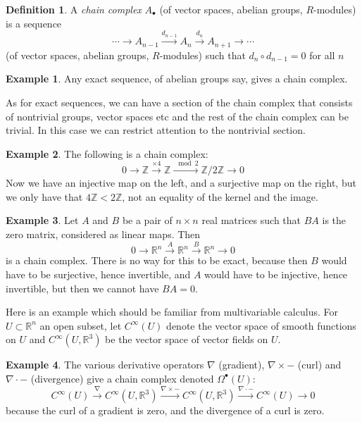 \documentclass{tufte-handout}
\def\RR{\mathbb{R}}
\def\ZZ{\mathbb{Z}}
\DeclareMathOperator{\im}{im}
\theoremstyle{definition}
\newtheorem{definition}{Definition}
\newtheorem{example}{Example}
\begin{document}
\begin{definition}
A \emph{chain complex} $A_\bullet$ (of vector spaces, abelian groups, $R$-modules) is a sequence 
\[
	\cdots \to A_{n-1} \xrightarrow{d_{n-1}} A_n \xrightarrow{d_n} A_{n+1} \to \cdots
\]
(of vector spaces, abelian groups, $R$-modules) such that $d_n\circ d_{n-1} = 
0$\marginnote{equivalently, $\im(d_{n-1}) \subseteq \ker(d_n)$} for all $n$
\end{definition}

\begin{example}
Any exact sequence, of abelian groups say, gives a chain complex.
\end{example}

As for exact sequences, we can have a section of the chain complex that consists of nontrivial groups, vector spaces etc and the rest of the chain complex can be trivial. In this case we can restrict attention to the nontrivial section.

\begin{example}
The following is a chain complex:
\[
	0\to \ZZ \xrightarrow{\times 4} \ZZ \xrightarrow{\mod{2}} \ZZ/2\ZZ \to 0
\]
Now we have an injective map on the left, and a surjective map on the right, but we only have that $4\ZZ < 2\ZZ$, not an equality of the kernel and the image.
\end{example}


\begin{example}
Let $A$ and $B$ be a pair of $n\times n$ real matrices such that $BA$ is the zero matrix, considered as linear maps. Then
\[
	0\to \RR^n \xrightarrow{A} \RR^n \xrightarrow{B} \RR^n \to 0
\]
is a chain complex. There is no way for this to be exact, because then $B$ would have to be surjective, hence invertible, and $A$ would have to be injective, hence invertible, but then we cannot have $BA=0$.
\end{example}

Here is an example which should be familiar from multivariable calculus. For $U\subset \RR^n$ an open subset, let $C^\infty(U)$ denote the vector space of smooth functions on $U$ and $C^\infty(U,\RR^3)$ be the vector space of vector fields on $U$.

\begin{example}
The various derivative operators $\nabla$ (gradient), $\nabla\times-$ (curl) and $\nabla\cdot -$ (divergence) give a chain complex denoted $\Omega^\bullet(U)$:
\[
	C^\infty(U) \xrightarrow{\nabla} C^\infty(U,\RR^3) \xrightarrow{\nabla\times -} C^\infty(U,\RR^3) \xrightarrow{\nabla\cdot -} C^\infty(U) \to 0
\]
because the curl of a gradient is zero, and the divergence of a curl is zero.
\end{example}
\end{document}
